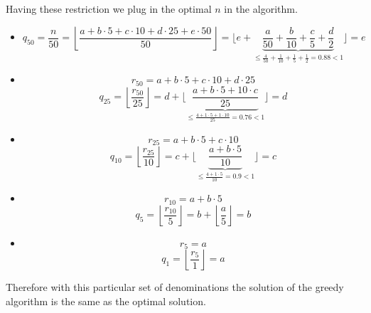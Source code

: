 \documentclass[10pt,a4paper]{article}
\begin{document}
Having these restriction we plug in the optimal $n$ in the algorithm.
\begin{itemize}
\item $$ q_{50} = \frac{n}{50} = \left\lfloor\frac{a + b\cdot 5 + c\cdot 10 + d\cdot 25 + e \cdot 50}{50}\right\rfloor = \Bigg\lfloor e + \underbrace{\frac{a}{50} + \frac{b}{10} + \frac{c}{5} + \frac{d}{2}}_{\leq \frac{4}{50} + \frac{1}{10} + \frac{1}{5} + \frac{1}{2} = 0.88 < 1}\Bigg\rfloor = e
$$
\item 
$$r_{50} = a + b\cdot 5 + c\cdot 10 + d\cdot 25 $$
$$q_{25} = \left\lfloor \frac{r_{50}}{25}\right\rfloor = d +\Bigg \lfloor \underbrace{\frac{a + b \cdot 5 + 10 \cdot c}{25}}_{\leq \frac{4 + 1 \cdot 5 + 1 \cdot 10}{25} = 0.76 < 1} \Bigg\rfloor = d$$
\item 
$$r_{25} = a + b\cdot 5 + c\cdot 10 $$
$$q_{10} = \left\lfloor\frac{r_{25}}{10}\right\rfloor = c + \Bigg\lfloor \underbrace{\frac{a + b\cdot 5}{10}}_{\leq \frac{4 + 1 \cdot 5}{10} = 0.9 < 1}  \Bigg\rfloor = c$$
\item 
$$r_{10} = a + b\cdot 5$$
$$q_{5} = \left\lfloor\frac{r_{10}}{5}\right\rfloor = b + \left\lfloor \frac{a}{5} \right\rfloor = b$$
\item $$r_{5} = a$$
$$q_{1} = \left\lfloor \frac{r_{5}}{1} \right\rfloor = a$$
\end{itemize}
Therefore with this particular set of denominations the solution of the greedy algorithm is the same as the optimal solution.
\end{document}
